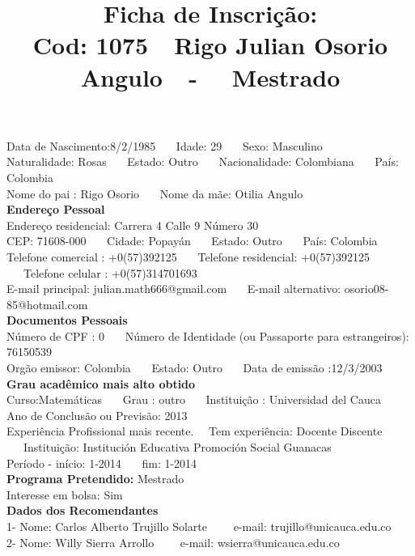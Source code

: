 \documentclass[11pt]{article}
\title{\vspace*{-4cm} Ficha de Inscrição: \\Cod: 1075\ \ Rigo Julian  Osorio Angulo\ \ - \ \ Mestrado 
 }
\date{}
\begin{document}
\maketitle
\vspace*{-1.5cm}
\noindent Data de Nascimento:8/2/1985
\ \ \ Idade: 29   \ \ \ Sexo: Masculino
\\
Naturalidade: Rosas  
\ \ \  Estado: Outro
\ \ \  Nacionalidade: Colombiana
\ \ \ País: Colombia
\\        
Nome do pai : Rigo Osorio
\ \ \ Nome da mãe: Otilia Angulo          
\\[0.2cm]                     
\textbf{Endereço Pessoal} 
\\ 
\noindent Endereço residencial: Carrera 4 Calle 9 Número 30
\\
        CEP: 71608-000 
\ \ \ Cidade: Popayán 
\ \ \ Estado: Outro 
\ \ \ País: Colombia
\\		
		Telefone comercial : +0(57)392125
\ \ \ Telefone residencial: +0(57)392125
\ \ \ Telefone celular : +0(57)314701693
\\
E-mail principal: julian.math666@gmail.com
\ \ \ E-mail alternativo: osorio08-85@hotmail.com 
\\[0.2cm] 
\textbf{Documentos Pessoais}
\\
\noindent Número de CPF : 0
\ \ \ Número de Identidade (ou Passaporte para estrangeiros): 76150539
\\
Orgão emissor: Colombia
\ \ \ Estado: Outro
\ \ \ Data de emissão :12/3/2003
\\[0.3cm]
\textbf{Grau acadêmico mais alto obtido}
\\	
Curso:Matemáticas
\ \ \ Grau : outro
\ \ \ Instituição : Universidad del Cauca
\\			
Ano de Conclusão ou Previsão: 2013
\\ 
Experiência Profissional mais recente. \ \  
Tem experiência: Docente Discente  
\ \ \ Instituição: Institución Educativa Promoción Social Guanacas
\\  
Período - início: 1-2014
\ \ \ fim: 1-2014
\\[0.2cm] 
\textbf{Programa Pretendido:} Mestrado\\
Interesse em bolsa: Sim
\\[0.3cm]		
\textbf{Dados dos Recomendantes} 
\\
1- Nome: Carlos Alberto Trujillo Solarte
\ \ \ \  e-mail: trujillo@unicauca.edu.co 
\\
2- Nome: Willy Sierra Arrollo
\ \ \ \ e-mail: wsierra@unicauca.edu.co
\\
\end{document}
